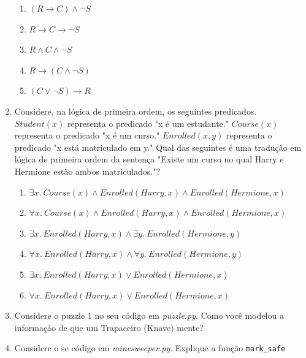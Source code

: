 \documentclass[a4paper,12pt]{article}
\begin{document}
\begin{enumerate}
\begin{enumerate}
    \item $(R \to C) \land \neg S$
    \item $R \to C \to \neg S$
    \item $R \land C \land \neg S$
    \item $R \to (C \land \neg S)$
    \item $(C \lor \neg S) \to R$
\end{enumerate}

\item  Considere, na lógica de primeira ordem, os seguintes predicados. $Student(x)$ representa o predicado "x é um estudante." $Course(x)$ representa o predicado "x é um curso." $Enrolled(x, y)$ representa o predicado "x está matriculado em y." Qual das seguintes é uma tradução em lógica de primeira ordem da sentença "Existe um curso no qual Harry e Hermione estão ambos matriculados."?

\begin{enumerate}
    \item $\exists x.\ Course(x) \land Enrolled(Harry, x) \land Enrolled(Hermione, x)$
    \item $\forall x.\ Course(x) \land Enrolled(Harry, x) \land Enrolled(Hermione, x)$
    \item $\exists x.\ Enrolled(Harry, x) \land \exists y.\ Enrolled(Hermione, y)$
    \item $\forall x.\ Enrolled(Harry, x) \land \forall y.\ Enrolled(Hermione, y)$
    \item $\exists x.\ Enrolled(Harry, x) \lor Enrolled(Hermione, x)$
    \item $\forall x.\ Enrolled(Harry, x) \lor Enrolled(Hermione, x)$
\end{enumerate}

\item Considere o puzzle 1 no seu código em \textit{puzzle.py}. Como você modelou a informação de que um Trapaceiro (Knave) mente?

\item Considere o se código em \textit{minesweeper.py}. Explique a função \texttt{mark\_safe}

\end{enumerate}
\end{document}
